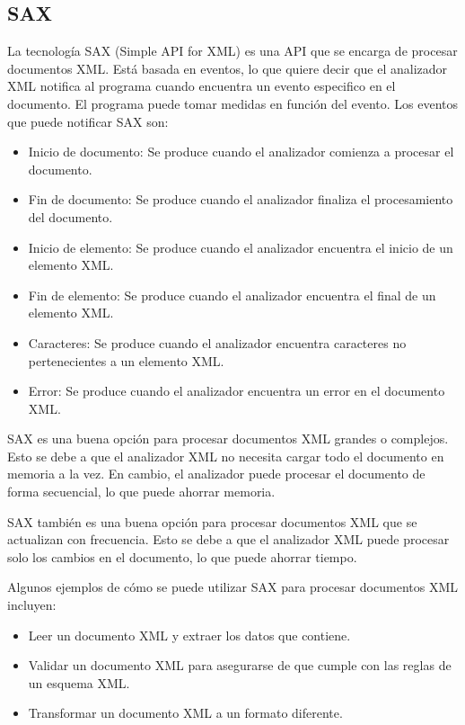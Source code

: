 \subsection{SAX}
\noindent La tecnología SAX (Simple API for XML) es una API que se encarga de procesar documentos XML. Está basada en eventos, lo que quiere decir que el analizador XML notifica al programa cuando encuentra un evento especifico en el documento. El programa puede tomar medidas en función del evento. Los eventos que puede notificar SAX son:
\begin{itemize}
    \item Inicio de documento: Se produce cuando el analizador comienza a procesar el documento.
    \item Fin de documento: Se produce cuando el analizador finaliza el procesamiento del documento.
    \item Inicio de elemento: Se produce cuando el analizador encuentra el inicio de un elemento XML.
    \item Fin de elemento: Se produce cuando el analizador encuentra el final de un elemento XML.
    \item Caracteres: Se produce cuando el analizador encuentra caracteres no pertenecientes a un elemento XML.
    \item Error: Se produce cuando el analizador encuentra un error en el documento XML.
\end{itemize}

SAX es una buena opción para procesar documentos XML grandes o complejos. Esto se debe a que el analizador XML no necesita cargar todo el documento en memoria a la vez. En cambio, el analizador puede procesar el documento de forma secuencial, lo que puede ahorrar memoria.

SAX también es una buena opción para procesar documentos XML que se actualizan con frecuencia. Esto se debe a que el analizador XML puede procesar solo los cambios en el documento, lo que puede ahorrar tiempo.

Algunos ejemplos de cómo se puede utilizar SAX para procesar documentos XML incluyen:
\begin{itemize}
    \item Leer un documento XML y extraer los datos que contiene.
    \item Validar un documento XML para asegurarse de que cumple con las reglas de un esquema XML.
    \item Transformar un documento XML a un formato diferente.
\end{itemize}

